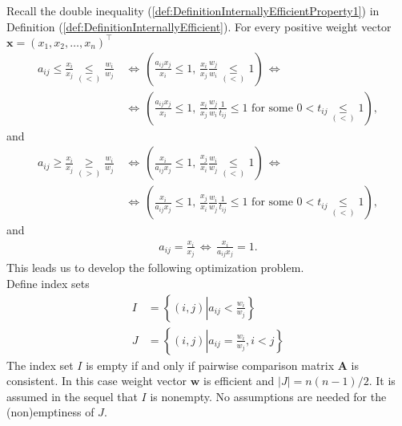 \documentclass{article}
\theoremstyle{plain}
\begin{document}
Recall the double inequality (\ref{def:DefinitionInternallyEfficientProperty1}) in Definition
(\ref{def:DefinitionInternallyEfficient}). For every positive weight vector
$\mathbf{x}=(x_1,x_2,\ldots,x_n)^{\top}$
\begin{equation}
\label{aijxixjeq1} %
\begin{aligned}
a_{ij} \leq \frac{x_i}{x_j} \underset{(<)}{\leq} \frac{w_i}{w_j} \, &\Longleftrightarrow \,
\left( \frac{a_{ij}x_j}{x_i}  \leq 1, \, \frac{x_i}{x_j} \frac{w_j}{w_i} \underset{(<)}{\leq} 1 \right) \, \Longleftrightarrow \\
&\Longleftrightarrow \, \left( \frac{a_{ij}x_j}{x_i}  \leq 1, \, \frac{x_i}{x_j} \frac{w_j}{w_i} \frac{1}{t_{ij}} \leq 1 \text{ for some }
0 < t_{ij} \underset{(<)}{\leq} 1 \right),
\end{aligned}
\end{equation}
and
\begin{equation}
\label{aijxixjeq2}  %
\begin{aligned}
a_{ij} \geq \frac{x_i}{x_j} \underset{(>)}{\geq} \frac{w_i}{w_j} \, &\Longleftrightarrow \,
\left( \frac{x_i}{a_{ij}x_j}  \leq 1, \, \frac{x_j}{x_i} \frac{w_i}{w_j} \underset{(<)}{\leq} 1 \right) \, \Longleftrightarrow \\
&\Longleftrightarrow \, \left( \frac{x_i}{a_{ij}x_j}  \leq 1, \, \frac{x_j}{x_i} \frac{w_i}{w_j} \frac{1}{t_{ij}} \leq 1 \text{ for some }
0 < t_{ij} \underset{(<)}{\leq} 1 \right),
\end{aligned}
\end{equation}
and
\begin{equation}
\label{aijxixjeq3}  %
\begin{aligned}
a_{ij}  = \frac{x_i}{x_j}  \, \Longleftrightarrow \, \frac{x_i}{a_{ij}x_j}  = 1.
\end{aligned}
\end{equation}
This leads us to develop the following optimization problem.\\

Def{\kern0pt}ine index sets
\begin{align}
 I &= \left\{ (i,j) \left|  a_{ij} < \frac{w_i}{w_j}   \right. \right\} \nonumber  \\
 J &= \left\{ (i,j) \left|  a_{ij} = \frac{w_i}{w_j}, i < j   \right. \right\} \nonumber
\end{align}
The index set $I$ is empty if and only if pairwise comparison matrix $\mathbf{A}$ is consistent. In this case
weight vector $\mathbf{w}$ is ef{\kern0pt}f{\kern0pt}icient and $|J| = n(n-1)/2$.
It is assumed in the sequel that $I$ is nonempty. No assumptions are needed for the (non)emptiness of $J$.
\end{document}
